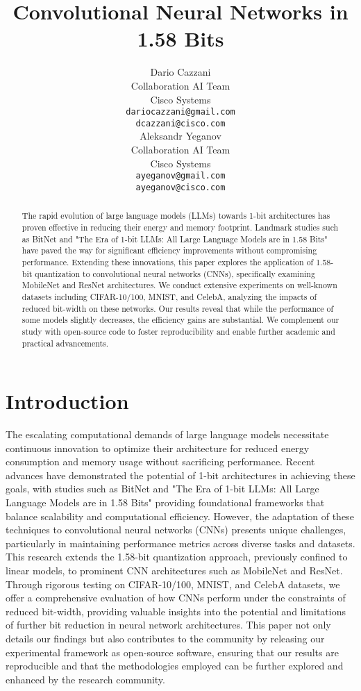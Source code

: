 \documentclass{article}
\title{Convolutional Neural Networks in 1.58 Bits}
\author{%
  Dario Cazzani \\
  Collaboration AI Team \\
  Cisco Systems \\
  \texttt{dariocazzani@gmail.com} \\
  \texttt{dcazzani@cisco.com} \\
  \And
  Aleksandr Yeganov \\
  Collaboration AI Team \\
  Cisco Systems \\
  \texttt{ayeganov@gmail.com} \\
  \texttt{ayeganov@cisco.com}
}
\begin{document}
\maketitle

\begin{abstract}
The rapid evolution of large language models (LLMs) towards 1-bit architectures has proven effective in reducing their energy and memory footprint. Landmark studies such as BitNet \cite{wang2023bitnet} and "The Era of 1-bit LLMs: All Large Language Models are in 1.58 Bits" \cite{ma2024era} have paved the way for significant efficiency improvements without compromising performance. Extending these innovations, this paper explores the application of 1.58-bit quantization to convolutional neural networks (CNNs), specifically examining MobileNet and ResNet architectures. We conduct extensive experiments on well-known datasets including CIFAR-10/100, MNIST, and CelebA, analyzing the impacts of reduced bit-width on these networks. Our results reveal that while the performance of some models slightly decreases, the efficiency gains are substantial. We complement our study with open-source code to foster reproducibility and enable further academic and practical advancements.
\end{abstract}

\section{Introduction}

The escalating computational demands of large language models necessitate continuous innovation to optimize their architecture for reduced energy consumption and memory usage without sacrificing performance. Recent advances have demonstrated the potential of 1-bit architectures in achieving these goals, with studies such as BitNet \cite{wang2023bitnet} and "The Era of 1-bit LLMs: All Large Language Models are in 1.58 Bits" \cite{ma2024era} providing foundational frameworks that balance scalability and computational efficiency. However, the adaptation of these techniques to convolutional neural networks (CNNs) presents unique challenges, particularly in maintaining performance metrics across diverse tasks and datasets. This research extends the 1.58-bit quantization approach, previously confined to linear models, to prominent CNN architectures such as MobileNet and ResNet. Through rigorous testing on CIFAR-10/100, MNIST, and CelebA datasets, we offer a comprehensive evaluation of how CNNs perform under the constraints of reduced bit-width, providing valuable insights into the potential and limitations of further bit reduction in neural network architectures. This paper not only details our findings but also contributes to the community by releasing our experimental framework as open-source software, ensuring that our results are reproducible and that the methodologies employed can be further explored and enhanced by the research community.
\end{document}
